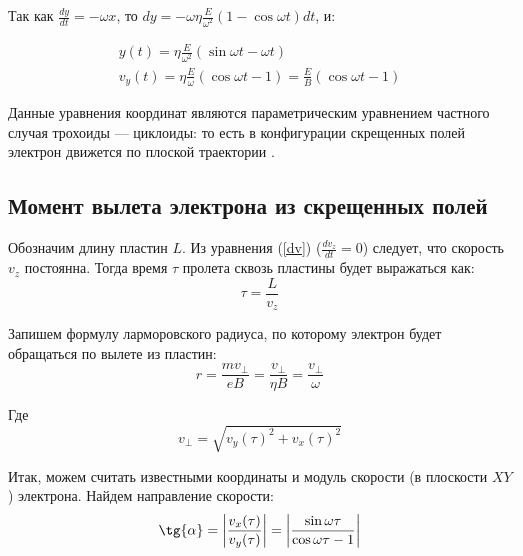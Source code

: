 Так как $\frac{dy}{dt}=-\omega{x}$, то $dy=-\omega\eta\frac{E}{\omega^2}(1-\cos{\omega{t}}){dt}$, и:

\begin{gather}
	\label{eq:y_t}
	y(t)=\eta\frac{E}{\omega^2}(\sin{\omega{t}}-\omega{t})\\
	v_y(t)=\eta\frac{E}{\omega}(\cos\omega{t}-1)=\frac{E}{B}(\cos\omega{t}-1)
\end{gather}

Данные уравнения координат являются параметрическим уравнением частного случая трохоиды --- циклоиды: то есть в конфигурации скрещенных полей электрон движется по плоской траектории \cite{bellustin,arcimovich,andreev}.

\subsection{Момент вылета электрона из скрещенных полей}

Обозначим длину пластин $L$. Из уравнения (\ref{dv}) ($\frac{dv_z}{dt}=0$) следует, что скорость $v_z$ постоянна. Тогда время $\tau$ пролета сквозь пластины будет выражаться как:
\begin{equation}
	\tau=\frac{L}{v_z}
\end{equation}

Запишем формулу ларморовского радиуса, по которому электрон будет обращаться по вылете из пластин:
\begin{equation}
	r=\frac{mv_\perp}{eB}=\frac{v_\perp}{\eta{B}}=\frac{v_\perp}{\omega}
\end{equation}

Где 
\begin{equation}
	v_\perp=\sqrt{v_y(\tau)^2+v_x(\tau)^2}
\end{equation}

Итак, можем считать известными координаты и модуль скорости (в плоскости $XY$) электрона. 
Найдем направление скорости:
\begin{equation}
	\label{eq:tg_a}
	\tg{\alpha}=\left|\frac{v_x(\tau)}{v_y(\tau)}\right|=\left|\frac{\sin{\omega{\tau}}}{\cos\omega{\tau}-1}\right|
\end{equation}



